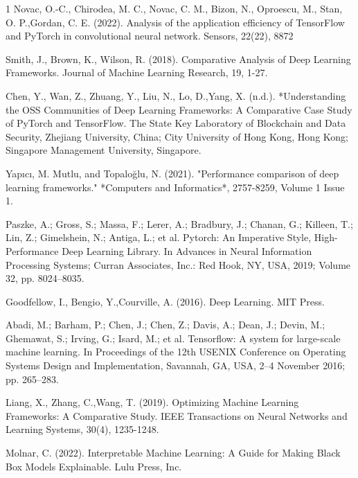 \documentclass[conference]{IEEEtran}
\begin{document}
\begin{thebibliography}{1}
Novac, O.-C., Chirodea, M. C., Novac, C. M., Bizon, N., Oproescu, M., Stan, O. P.,Gordan, C. E. (2022). Analysis of the application efficiency of TensorFlow and PyTorch in convolutional neural network. Sensors, 22(22), 8872

Smith, J., Brown, K., Wilson, R. (2018). Comparative Analysis of Deep Learning Frameworks. Journal of Machine Learning Research, 19, 1-27. 

Chen, Y., Wan, Z., Zhuang, Y., Liu, N., Lo, D.,Yang, X. (n.d.). *Understanding the OSS Communities of Deep Learning Frameworks: A Comparative Case Study of PyTorch and TensorFlow. The State Key Laboratory of Blockchain and Data Security, Zhejiang University, China; City University of Hong Kong, Hong Kong; Singapore Management University, Singapore.

Yapıcı, M. Mutlu, and Topaloğlu, N. (2021). "Performance comparison of deep learning frameworks." *Computers and Informatics*, 2757-8259, Volume 1 Issue 1.

Paszke, A.; Gross, S.; Massa, F.; Lerer, A.; Bradbury, J.; Chanan, G.; Killeen, T.; Lin, Z.; Gimelshein, N.; Antiga, L.; et al. Pytorch: An Imperative Style, High-Performance Deep Learning Library. In Advances in Neural Information Processing Systems; Curran Associates, Inc.: Red Hook, NY, USA, 2019; Volume 32, pp. 8024–8035. 


Goodfellow, I., Bengio, Y.,Courville, A. (2016). Deep Learning. MIT Press.

Abadi, M.; Barham, P.; Chen, J.; Chen, Z.; Davis, A.; Dean, J.; Devin, M.; Ghemawat, S.; Irving, G.; Isard, M.; et al. Tensorflow: A system for large-scale machine learning. In Proceedings of the 12th USENIX Conference on Operating Systems Design and Implementation, Savannah, GA, USA, 2–4 November 2016; pp. 265–283.

Liang, X., Zhang, C.,Wang, T. (2019). Optimizing Machine Learning Frameworks: A Comparative Study. IEEE Transactions on Neural Networks and Learning Systems, 30(4), 1235-1248.


Molnar, C. (2022). Interpretable Machine Learning: A Guide for Making Black Box Models Explainable. Lulu Press, Inc.

\end{thebibliography}


\end{document}
